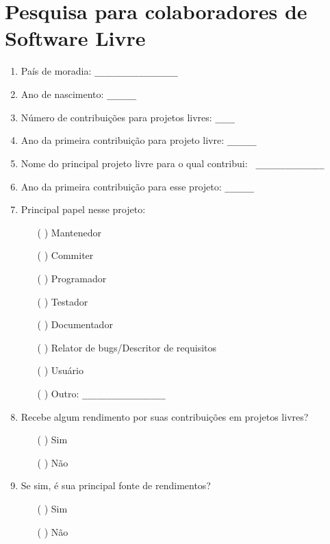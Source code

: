\chapter{Pesquisa para colaboradores de Software Livre}
\label{ape:OS}

\singlespacing

\begin{enumerate}
\item País de moradia: \verb=_________________=

\item Ano de nascimento: \verb=______=

\item Número de contribuições para projetos livres: \verb=____=

\item Ano da primeira contribuição para projeto livre: \verb=______=

\item Nome do principal projeto livre para o qual contribui:
  \verb= ______________=

\item Ano da primeira contribuição para esse projeto: \verb=______=

\item Principal papel nesse projeto:
  \begin{itemize}
  \item[( )] Mantenedor
  \item[( )] Commiter
  \item[( )] Programador
  \item[( )] Testador
  \item[( )] Documentador
  \item[( )] Relator de bugs/Descritor de requisitos
  \item[( )] Usuário
  \item[( )] Outro: \verb=_________________=
  \end{itemize}

\item Recebe algum rendimento por suas contribuições em projetos
  livres?
  \begin{itemize}
  \item[( )] Sim
  \item[( )] Não
  \end{itemize}

\item Se sim, é sua principal fonte de rendimentos?
  \begin{itemize}
  \item[( )] Sim
  \item[( )] Não
  \end{itemize}


\end{enumerate}
